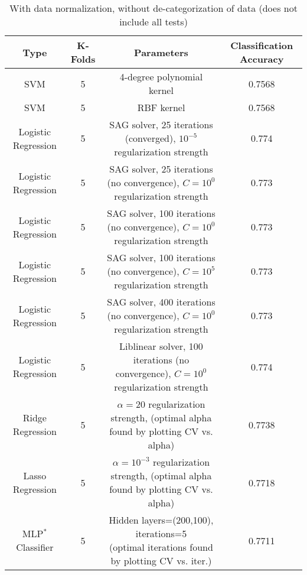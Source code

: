 \def\arraystretch{1.2}%
\begin{longtable}{c|c|c|c}
\caption{With data normalization, without de-categorization of data (does not include all tests)}\\\hline
Type & K-Folds & Parameters & Classification Accuracy \\\hline
SVM & 5 & 4-degree polynomial kernel & 0.7568 \\\hline
SVM & 5 & RBF kernel & 0.7568 \\\hline
Logistic Regression & 5 & \makecell*{SAG solver, 25 iterations (converged),\\ $10^{-5}$ regularization strength} & 0.774 \\\hline
Logistic Regression & 5 & \makecell*{SAG solver, 25 iterations (no \\convergence), $C=10^{0}$ regularization strength} & 0.773 \\\hline
Logistic Regression & 5 & \makecell*{SAG solver, 100 iterations (no \\convergence), $C=10^{0}$ regularization strength} & 0.773 \\\hline
Logistic Regression & 5 & \makecell*{SAG solver, 100 iterations (no \\convergence), $C=10^{5}$ regularization strength} & 0.773 \\\hline
Logistic Regression & 5 & \makecell*{SAG solver, 400 iterations (no \\convergence), $C=10^{0}$ regularization strength} & 0.773 \\\hline
Logistic Regression & 5 & \makecell*{Liblinear solver, 100 iterations (no \\convergence), $C=10^{0}$ regularization strength} & 0.774 \\\hline
Ridge Regression & 5 & \makecell*{$\alpha=20$ regularization strength,\\ (optimal alpha found by plotting CV vs. alpha)} & 0.7738 \\\hline
Lasso Regression & 5 & \makecell*{$\alpha=10^{-3}$ regularization strength,\\ (optimal alpha found by plotting CV vs. alpha)} & 0.7718 \\\hline
MLP$^{*}$ Classifier & 5 & \makecell*{Hidden layers=(200,100), iterations=5 \\ (optimal iterations found by plotting CV vs. iter.)} & 0.7711 \\\hline

\end{longtable}

